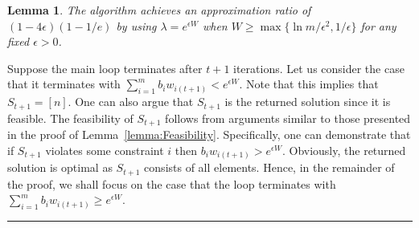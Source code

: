 \documentclass[11pt]{article}
\theoremstyle{plain}
\newtheorem{lemma}[theorem]{Lemma}
\theoremstyle{definition}
\newcommand{\qedsymb}{\hfill{\rule{2mm}{2mm}}}
\renewenvironment{proof}{\begin{trivlist} \item[\hspace{\labelsep}{\bf \noindent Proof.\/}] }{\qedsymb\end{trivlist}}\newenvironment{proofof}[1]{\begin{trivlist} \item[\hspace{\labelsep}{\bf \noindent Proof of #1.\/}] }{\qedsymb\end{trivlist}}\newenvironment{MyEqn}[1]{\setlength\arraycolsep{2pt}\begin{eqnarray*} #1}{\end{eqnarray*}}
\begin{document}
\begin{lemma} \label{lemma:Approx2}
The algorithm achieves an approximation ratio of $(1 -
4\epsilon)(1 - 1/e)$ by using $\lambda = e^{\epsilon W}$ when $W
\geq \max\{\ln m / \epsilon^2, 1 / \epsilon\}$ for any fixed
$\epsilon > 0$.
\end{lemma}
\begin{proof}
Suppose the main loop terminates after $t+1$ iterations. Let us
consider the case that it terminates with $\sum_{i=1}^m b_i
w_{i(t+1)} < e^{\epsilon W}$. Note that this implies that $S_{t+1}
= [n]$. One can also argue that $S_{t+1}$ is the returned solution
since it is feasible. The feasibility of $S_{t+1}$ follows from
arguments similar to those presented in the proof of
Lemma~\ref{lemma:Feasibility}. Specifically, one can demonstrate
that if $S_{t+1}$ violates some constraint $i$ then $b_i
w_{i(t+1)} > e^{\epsilon W}$. Obviously, the returned solution is
optimal as $S_{t+1}$ consists of all elements. Hence, in the
remainder of the proof, we shall focus on the case that the loop
terminates with $\sum_{i=1}^m b_i w_{i(t+1)} \geq e^{\epsilon W}$.


\end{proof}
\end{document}
